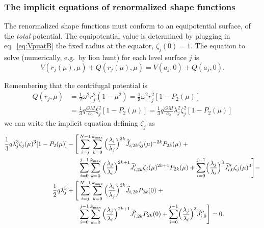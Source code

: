 \documentclass[amsmath,amsfonts,rmp,letterpaper]{revtex4}
\newcommand{\sub}[1]{_{\text{#1}}} %
\newcommand{\ptk}{P_{2k}}
\newcommand{\kmax}{k\sub{max}}
\newcommand{\Jtil}{\widetilde{J}}
\newcommand{\sumkmax}{\sum_{k=0}^{\kmax}}
\begin{document}
\subsubsection{The implicit equations of renormalized shape functions}

The renormalized shape functions must conform to an equipotential surface, of the
\emph{total} potential. The equipotential value is determined by plugging in
eq.~\eqref{eq:VpuatB} the fixed radius at the equator, $\zeta_j(0)=1$. The
equation to solve (numerically, e.g.~by lion hunt) for each level surface $j$ is
\begin{equation}
V(r_j(\mu),\mu) + Q(r_j(\mu),\mu) = V(a_j,0) + Q(a_j,0).
\end{equation}

Remembering
that the centrifugal potential is
\begin{equation*}
\begin{split}
Q(r_j,\mu) &= \frac{1}{2}\omega^2r_j^2(1-\mu^2) =
\frac{1}{3}\omega^2r_j^2[1 - P_2(\mu)] \\
&= \frac{1}{3}q\frac{GM}{a_0}\xi_j^2[1 - P_2(\mu)] =
\frac{1}{3}q\frac{GM}{a_0}\lambda_j^2\zeta_j^2[1 - P_2(\mu)]
\end{split}
\end{equation*}
we can write the implicit equation defining $\zeta_j$ as
\begin{equation}\label{eq:implicit_zeta_equation}
\begin{split} 
\frac{1}{3}q\lambda_j^3\zeta_j(\mu)^3[1 - P_2(\mu)] -\Biggl[
&\sum_{i=j}^{N-1}\sumkmax{}\Bigl(\frac{\lambda_i}{\lambda_j}\Bigr)^{2k}
\Jtil_{i,2k}\zeta_j(\mu)^{-2k}\ptk(\mu)\; + \\
&\sum_{i=0}^{j-1}\sumkmax{}\Bigl(\frac{\lambda_j}{\lambda_i}\Bigr)^{2k+1}
\Jtil'_{i,2k}\zeta_j(\mu)^{2k+1}\ptk(\mu) + 
\sum_{i=0}^{j-1}\Bigl(\frac{\lambda_j}{\lambda_i}\Bigr)^3
\Jtil''_{i,0}\zeta_j(\mu)^3
\Biggr] - \\
\frac{1}{2}q\lambda_j^3 + \Biggl[
&\sum_{i=j}^{N-1}\sumkmax{}\Bigl(\frac{\lambda_i}{\lambda_j}\Bigr)^{2k}
\Jtil_{i,2k}\ptk(0)\; + \\
&\sum_{i=0}^{j-1}\sumkmax{}\Bigl(\frac{\lambda_j}{\lambda_i}\Bigr)^{2k+1}
\Jtil'_{i,2k}\ptk(0) + 
\sum_{i=0}^{j-1}\Bigl(\frac{\lambda_j}{\lambda_i}\Bigr)^3
\Jtil''_{i,0}
\Biggr] = 0.
\end{split}
\end{equation}



\end{document}

